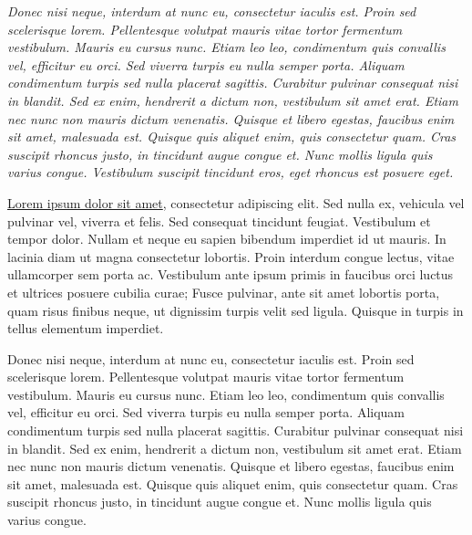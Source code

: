 \documentclass[12pt]{article}
\begin{document}
\vspace{2cm} %

\textit{
Donec nisi neque, interdum at nunc eu, consectetur iaculis est. Proin sed scelerisque lorem. Pellentesque volutpat mauris vitae tortor fermentum vestibulum. Mauris eu cursus nunc. Etiam leo leo, condimentum quis convallis vel, efficitur eu orci. Sed viverra turpis eu nulla semper porta. Aliquam condimentum turpis sed nulla placerat sagittis. Curabitur pulvinar consequat nisi in blandit. Sed ex enim, hendrerit a dictum non, vestibulum sit amet erat. Etiam nec nunc non mauris dictum venenatis. Quisque et libero egestas, faucibus enim sit amet, malesuada est. Quisque quis aliquet enim, quis consectetur quam. Cras suscipit rhoncus justo, in tincidunt augue congue et. Nunc mollis ligula quis varius congue. Vestibulum suscipit tincidunt eros, eget rhoncus est posuere eget.
}

\underline{Lorem ipsum dolor sit amet}, consectetur adipiscing elit. Sed nulla ex, vehicula vel pulvinar vel, viverra et felis. Sed consequat tincidunt feugiat. Vestibulum et tempor dolor. Nullam et neque eu sapien bibendum imperdiet id ut mauris. In lacinia diam ut magna consectetur lobortis. Proin interdum congue lectus, vitae ullamcorper sem porta ac. Vestibulum ante ipsum primis in faucibus orci luctus et ultrices posuere cubilia curae; Fusce pulvinar, ante sit amet lobortis porta, quam risus finibus neque, ut dignissim turpis velit sed ligula. Quisque in turpis in tellus elementum imperdiet.


\hspace{2cm} %
Donec nisi neque, interdum at nunc eu, consectetur iaculis est. Proin sed scelerisque lorem. Pellentesque volutpat mauris vitae tortor fermentum vestibulum. Mauris eu cursus nunc. Etiam leo leo, condimentum quis convallis vel, efficitur eu orci. Sed viverra turpis eu nulla semper porta. Aliquam condimentum turpis sed nulla placerat sagittis. Curabitur pulvinar consequat nisi in blandit. Sed ex enim, hendrerit a dictum non, vestibulum sit amet erat. Etiam nec nunc non mauris dictum venenatis. Quisque et libero egestas, faucibus enim sit amet, malesuada est. Quisque quis aliquet enim, quis consectetur quam. Cras suscipit rhoncus justo, in tincidunt augue congue et. Nunc mollis ligula quis varius congue.
\end{document}
